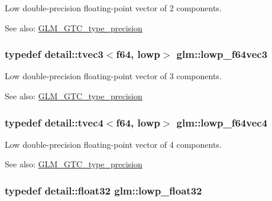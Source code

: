 Low double-precision floating-point vector of 2 components. \begin{Desc}
\item[See also:]\hyperlink{group__gtc__type__precision}{GLM\_\-GTC\_\-type\_\-precision} \end{Desc}
\hypertarget{group__gtc__type__precision_gd2d5e1436d926ae7201c860dce01a0fe}{
\subsubsection[lowp\_\-f64vec3]{\setlength{\rightskip}{0pt plus 5cm}typedef detail::tvec3$<$f64, lowp$>$ {\bf glm::lowp\_\-f64vec3}}}
\label{group__gtc__type__precision_gd2d5e1436d926ae7201c860dce01a0fe}


Low double-precision floating-point vector of 3 components. \begin{Desc}
\item[See also:]\hyperlink{group__gtc__type__precision}{GLM\_\-GTC\_\-type\_\-precision} \end{Desc}
\hypertarget{group__gtc__type__precision_gf99497c42a2d011fecab7f3f2312213d}{
\subsubsection[lowp\_\-f64vec4]{\setlength{\rightskip}{0pt plus 5cm}typedef detail::tvec4$<$f64, lowp$>$ {\bf glm::lowp\_\-f64vec4}}}
\label{group__gtc__type__precision_gf99497c42a2d011fecab7f3f2312213d}


Low double-precision floating-point vector of 4 components. \begin{Desc}
\item[See also:]\hyperlink{group__gtc__type__precision}{GLM\_\-GTC\_\-type\_\-precision} \end{Desc}
\hypertarget{group__gtc__type__precision_g92be8087f3c84504f3a44af1a9efc51e}{
\subsubsection[lowp\_\-float32]{\setlength{\rightskip}{0pt plus 5cm}typedef detail::float32 {\bf glm::lowp\_\-float32}}}
\label{group__gtc__type__precision_g92be8087f3c84504f3a44af1a9efc51e}


